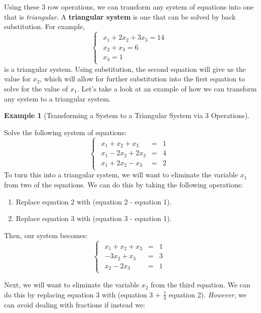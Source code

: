 \documentclass[
]{article}
\providecommand{\tightlist}{%
  \setlength{\itemsep}{0pt}\setlength{\parskip}{0pt}}
\theoremstyle{definition}
\theoremstyle{definition}
\newtheorem{example}{Example}[section]
\theoremstyle{definition}
\theoremstyle{definition}
\theoremstyle{remark}
\begin{document}
Using these 3 row operations, we can transform any system of equations into one that is \emph{triangular}. A \textbf{triangular system} is one that can be solved by back substitution. For example,
\[\begin{cases}\begin{align}
x_1+2x_2 +3x_3= 14\\
x_2+x_3 =6\\
x_3 = 1\end{align}\end{cases}\]
is a triangular system. Using substitution, the second equation will give us the value for \(x_2\), which will allow for further substitution into the first equation to solve for the value of \(x_1\). Let's take a look at an example of how we can transform any system to a triangular system.

\begin{example}[Transforming a System to a Triangular System via 3 Operations]
\protect\hypertarget{exm:rowopeq}{}\label{exm:rowopeq}

Solve the following system of equations:
\[\begin{cases}\begin{eqnarray}
x_1+x_2 +x_3&=& 1\\
x_1-2x_2+2x_3 &=&4\\
x_1+2x_2-x_3 &=& 2\end{eqnarray}\end{cases}\]
To turn this into a triangular system, we will want to eliminate the variable \(x_1\) from two of the equations. We can do this by taking the following operations:

\begin{enumerate}
\def\labelenumi{\alph{enumi}.}
\tightlist
\item
  Replace equation 2 with (equation 2 - equation 1).
\item
  Replace equation 3 with (equation 3 - equation 1).
\end{enumerate}

Then, our system becomes:
\[\begin{cases}\begin{eqnarray}
x_1+x_2 +x_3&=& 1\\
-3x_2+x_3 &=&3\\
x_2-2x_3 &=& 1\end{eqnarray}\end{cases}\]

Next, we will want to eliminate the variable \(x_2\) from the third equation. We can do this by replacing equation 3 with (equation 3 + \(\frac{1}{3}\) equation 2). \emph{However}, we can avoid dealing with fractions if instead we:


\end{example}
\end{document}
